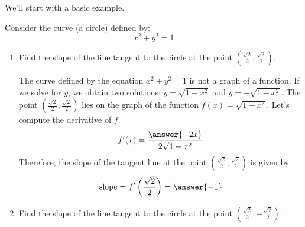 \documentclass{ximera}
\begin{document}
  We'll start with a basic example.
  \begin{example}
Consider the curve (a circle) defined by:
\[
x^2 + y^2 = 1
\]
\begin{enumerate}

\item Find the slope of the line tangent to the circle at the point $\left(\frac{\sqrt{2}}{2},\frac{\sqrt{2}}{2}\right)$.
\begin{explanation}
\begin{image}
    \end{image}

The curve defined by the equation  $x^2 + y^2 = 1$ is not a graph of a function. If we solve for $y$, we obtain two solutions:
$y=\sqrt{1-x^2}$ and $y=-\sqrt{1-x^2}$.
The point $\left(\frac{\sqrt{2}}{2},\frac{\sqrt{2}}{2}\right)$ lies on the graph of the function $f(x)=\sqrt{1-x^2}$.
Let's compute the derivative of $f$.
\[
f'(x)=\frac{\answer{-2x}}{2\sqrt{1-x^2}}
\]
Therefore, the slope of the tangent line at the point $\left(\frac{\sqrt{2}}{2},\frac{\sqrt{2}}{2}\right)$ is given by
\[
\text{slope}=f'\left(\frac{\sqrt{2}}{2}\right)=\answer{-1}
\]
  \end{explanation}
\item Find the slope of the line tangent to the circle at the point $\left(\frac{\sqrt{2}}{2},-\frac{\sqrt{2}}{2}\right)$.


\end{enumerate}
\end{example}
\end{document}
